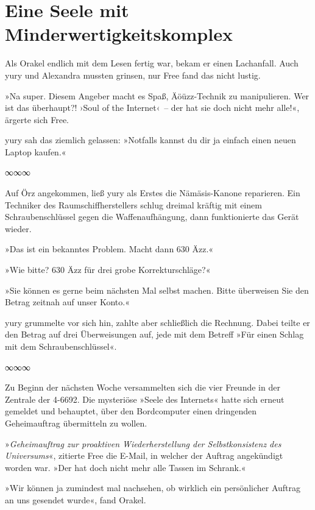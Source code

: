 
\chapter{Eine Seele mit Minderwertigkeitskomplex}

Als Orakel endlich mit dem Lesen fertig war, bekam er einen Lachanfall. Auch yury und Alexandra mussten grinsen, nur Free fand das nicht lustig.

»Na super. Diesem Angeber macht es Spaß, Äöüzz-Technik zu manipulieren. Wer ist das überhaupt?! ›Soul of the Internet‹~– der hat sie doch nicht mehr alle!«, ärgerte sich Free.

yury sah das ziemlich gelassen: »Notfalls kannst du dir ja einfach einen neuen Laptop kaufen.«

\begin{center}
    ∞∞∞
\end{center}

Auf Örz angekommen, ließ yury als Erstes die Nämäsis-Kanone reparieren. Ein Techniker des Raumschiffherstellers schlug dreimal kräftig mit einem Schraubenschlüssel gegen die Waffenaufhängung, dann funktionierte das Gerät wieder.

»Das ist ein bekanntes Problem. Macht dann 630 Äzz.«

»Wie bitte? 630 Äzz für drei grobe Korrekturschläge?«

»Sie können es gerne beim nächsten Mal selbst machen. Bitte überweisen Sie den Betrag zeitnah auf unser Konto.«

yury grummelte vor sich hin, zahlte aber schließlich die Rechnung. Dabei teilte er den Betrag auf drei Überweisungen auf, jede mit dem Betreff »Für einen Schlag mit dem Schraubenschlüssel«.

\begin{center}
    ∞∞∞
\end{center}

Zu Beginn der nächsten Woche versammelten sich die vier Freunde in der Zentrale der 4-6692. Die mysteriöse »Seele des Internets« hatte sich erneut gemeldet und behauptet, über den Bordcomputer einen dringenden Geheimauftrag übermitteln zu wollen.

»\textit{Geheimauftrag zur proaktiven Wiederherstellung der Selbstkonsistenz des Universums}«, zitierte Free die E-Mail, in welcher der Auftrag angekündigt worden war. »Der hat doch nicht mehr alle Tassen im Schrank.«

»Wir können ja zumindest mal nachsehen, ob wirklich ein persönlicher Auftrag an uns gesendet wurde«, fand Orakel.

